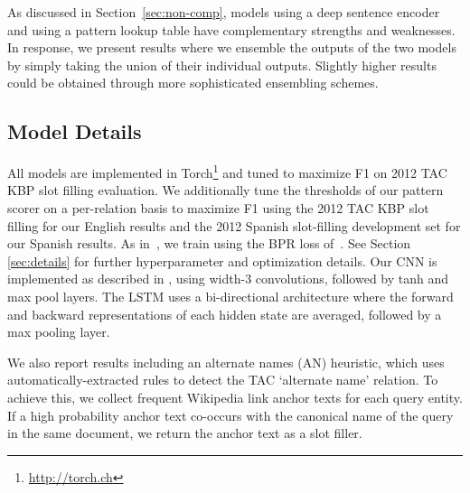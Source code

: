 
As discussed in Section~\ref{sec:non-comp}, models using a deep sentence encoder and using a pattern lookup table have complementary strengths and weaknesses. In response, we present results where we ensemble the outputs of the two models by simply taking the union of their individual outputs. Slightly higher results could be obtained through more sophisticated ensembling schemes. %


\subsection {Model Details \label{sec:models}}
All models are implemented in Torch\footnote{\url{http://torch.ch}} and tuned to maximize F1 on 2012 TAC KBP slot filling evaluation. We additionally tune the thresholds of our pattern scorer on a per-relation basis to maximize F1 using the 2012 TAC KBP slot filling for our English results and the 2012 Spanish slot-filling development set for our Spanish results. As in~\citet{limin}, we train using the BPR loss of~\citet{rendle2009bpr}. See Section \ref{sec:details} for further hyperparameter and optimization details. Our CNN is implemented as described in \citet{toutanova2015representing}, using width-3 convolutions, followed by tanh and max pool layers. The LSTM uses a bi-directional architecture where the forward and backward representations of each hidden state are averaged, followed by a max pooling layer.

We also report results including an alternate names (AN) heuristic, which uses automatically-extracted rules to detect the TAC `alternate name' relation. To achieve this, we collect frequent Wikipedia link anchor texts for each query entity.
If a high probability anchor text co-occurs with the canonical name of the query in the same document, we return the anchor text as a slot filler.